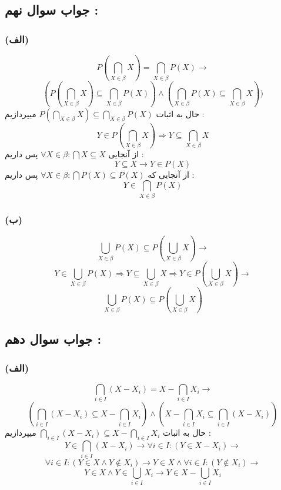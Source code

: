 \documentclass{article}
\begin{document}
        \subsection*{جواب سوال نهم : }
            \subsubsection*{(الف)}
                \[P(\bigcap_{X \in \beta} X) = \bigcap_{X \in \beta} P(X) \rightarrow \]
                \[(P(\bigcap_{X \in \beta} X) \subseteq \bigcap_{X \in \beta} P(X)) \land (\bigcap_{X \in \beta} P(X) \subseteq \bigcap_{X \in \beta} X))\]
                حال به اثبات $P(\bigcap_{X \in \beta} X) \subseteq \bigcap_{X \in \beta} P(X)$ میپردازیم :
                \[Y \in P(\bigcap_{X \in \beta} X) \Rightarrow Y \subseteq \bigcap_{X \in \beta} X\]
                از آنجایی $\forall X \in \beta : \bigcap X \subseteq X$ پس داریم :
                \[Y \subseteq X \rightarrow Y \in P(X)\]
                از آنجایی که $\forall X \in \beta : \bigcap P(X) \subseteq P(X)$ پس داریم :
                \[Y \in \bigcap_{X \in \beta} P(X)\]

            \subsubsection*{(ب)}
                \[\bigcup_{X \in \beta} P(X) \subseteq P(\bigcup_{X \in \beta} X) \rightarrow \]
                \[Y \in \bigcup_{X \in \beta} P(X) \Rightarrow Y \subseteq \bigcup_{X \in \beta} X \Rightarrow Y \in P(\bigcup_{X \in \beta} X) \rightarrow\]
                \[\bigcup_{X \in \beta} P(X) \subseteq P(\bigcup_{X \in \beta} X)\]

        \subsection*{جواب سوال دهم : }
            \subsubsection*{(الف)}
                \[\bigcap_{i \in I} (X - X_i) = X - \bigcap_{i \in I} X_i \rightarrow\]
                \[(\bigcap_{i \in I} (X - X_i) \subseteq X - \bigcap_{i \in I} X_i) \land (X - \bigcap_{i \in I} X_i \subseteq \bigcap_{i \in I} (X - X_i))\]
                حال به اثبات $\bigcap_{i \in I} (X - X_i) \subseteq X - \bigcap_{i \in I} X_i$ میپردازیم :
                \[Y \in \bigcap_{i \in I} (X - X_i) \rightarrow \forall i \in I : (Y \in X - X_i) \rightarrow\]
                \[\forall i \in I : (Y \in X \land Y \not \in X_i) \rightarrow Y \in X \land \forall i \in I : (Y \not \in X_i) \rightarrow\]
                \[Y \in X \land Y \in \bigcup_{i \in I} X_i \rightarrow Y \in X - \bigcup_{i \in I} X_i\]
            
\end{document}
